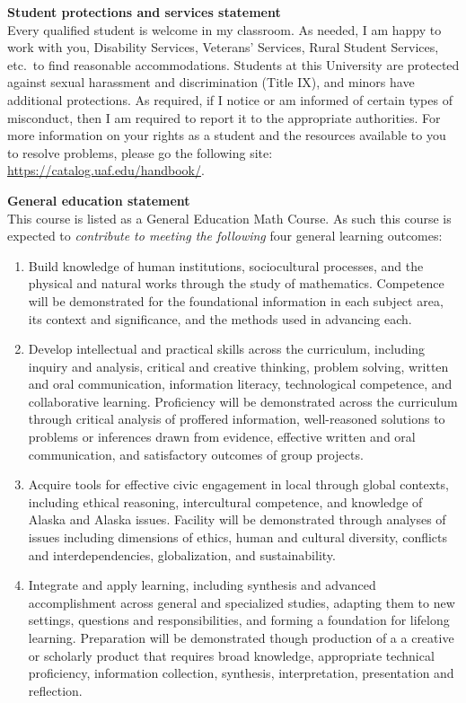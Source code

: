 \documentclass[11pt]{article}
\renewcommand{\emph}[1]{\textsf{\textbf{#1}}}
\newcommand{\localhead}[1]{\par\smallskip\textbf{#1} \smallskip\nobreak\\}%
\def\subheading#1{\localhead{\emph{#1}}}
\begin{document}
\subheading{Student protections and services statement}
Every qualified student is welcome in my classroom.  As needed, I am happy to work with you, Disability Services, Veterans' Services, Rural Student Services, etc.~to find reasonable accommodations.  Students at this University are protected against sexual harassment and discrimination (Title IX), and minors have additional protections.  As required, if I notice or am informed of certain types of misconduct, then I am required to report it to the appropriate authorities.  For more information on your rights as a student and the resources available to you to resolve problems, please go the following site: \url{https://catalog.uaf.edu/handbook/}.
 
\subheading{General education statement}
This course is listed as a General Education Math Course.  As such this course is expected to \textsl{contribute to meeting the following} four general learning outcomes:

\begin{enumerate}
\item Build knowledge of human institutions, sociocultural processes, and the physical and natural works through the study of mathematics.  Competence will be demonstrated for the foundational information in each subject area, its context and significance, and the methods used in advancing each.

\item Develop intellectual and practical skills across the curriculum, including inquiry and analysis, critical and creative thinking, problem solving, written and oral communication, information literacy, technological competence, and collaborative learning. Proficiency will be demonstrated across the curriculum through critical analysis of proffered information, well-reasoned solutions to problems or inferences drawn from evidence, effective written and oral communication, and satisfactory outcomes of group projects.

\item Acquire tools for effective civic engagement in local through global contexts, including ethical reasoning, intercultural competence, and knowledge of Alaska and Alaska issues.  Facility will be demonstrated through analyses of issues including dimensions of ethics, human and cultural diversity, conflicts and interdependencies, globalization, and sustainability.   

\item Integrate and apply learning, including synthesis and advanced accomplishment across general and specialized studies, adapting them to new settings, questions and responsibilities, and forming a foundation for lifelong learning. Preparation will be demonstrated though production of a a creative or scholarly product that requires broad knowledge, appropriate technical proficiency, information collection, synthesis, interpretation, presentation and reflection.
\end{enumerate}
\end{document}
